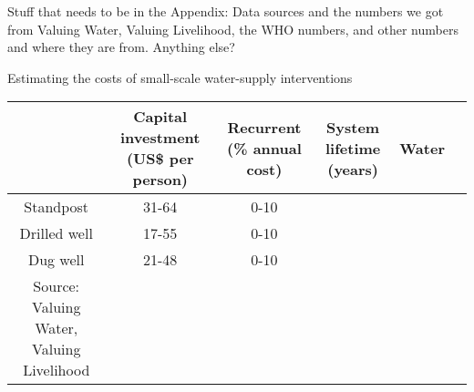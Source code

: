 Stuff that needs to be in the Appendix: 
Data sources and the numbers we got from Valuing Water, Valuing Livelihood, the WHO numbers, and other numbers and where they are from.
Anything else?
\begin{center}
Estimating the costs of small-scale water-supply interventions
\begin{tabular}{|c|c|c|c|c|c|}
\hline
& Capital investment (US\$ per person) & Recurrent (\% annual cost) & System lifetime (years) & Water \\ \hline
Standpost & 31-64 & 0-10 \\ \hline
Drilled well & 17-55 & 0-10 \\ \hline
Dug well & 21-48 & 0-10 \\
\hline
Source: Valuing Water, Valuing Livelihood
\end{tabular}
\end{center}

